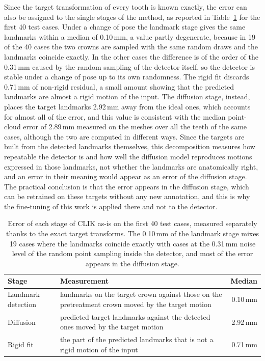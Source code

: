 \documentclass[10pt,a4paper]{article}
\begin{document}
Since the target transformation of every tooth is known exactly, the error can also be assigned to the single stages of the method, as reported in Table~\ref{tab:decomposition} for the first 40 test cases. Under a change of pose the landmark stage gives the same landmarks within a median of 0.10\,mm, a value partly degenerate, because in 19 of the 40 cases the two crowns are sampled with the same random draws and the landmarks coincide exactly. In the other cases the difference is of the order of the 0.31\,mm caused by the random sampling of the detector itself, so the detector is stable under a change of pose up to its own randomness. The rigid fit discards 0.71\,mm of non-rigid residual, a small amount showing that the predicted landmarks are almost a rigid motion of the input. The diffusion stage, instead, places the target landmarks 2.92\,mm away from the ideal ones, which accounts for almost all of the error, and this value is consistent with the median point-cloud error of 2.89\,mm measured on the meshes over all the teeth of the same cases, although the two are computed in different ways. Since the targets are built from the detected landmarks themselves, this decomposition measures how repeatable the detector is and how well the diffusion model reproduces motions expressed in those landmarks, not whether the landmarks are anatomically right, and an error in their meaning would appear as an error of the diffusion stage. The practical conclusion is that the error appears in the diffusion stage, which can be retrained on these targets without any new annotation, and this is why the fine-tuning of this work is applied there and not to the detector.

\begin{table}[H]
\centering
\small
\begin{tabularx}{\textwidth}{@{}lXr@{}}
\toprule
Stage & Measurement & Median \\
\midrule
Landmark detection & landmarks on the target crown against those on the pretreatment crown moved by the target motion & 0.10\,mm \\
Diffusion & predicted target landmarks against the detected ones moved by the target motion & 2.92\,mm \\
Rigid fit & the part of the predicted landmarks that is not a rigid motion of the input & 0.71\,mm \\
\bottomrule
\end{tabularx}
\caption{Error of each stage of CLIK as-is on the first 40 test cases, measured separately thanks to the exact target transforms. The 0.10\,mm of the landmark stage mixes 19 cases where the landmarks coincide exactly with cases at the 0.31\,mm noise level of the random point sampling inside the detector, and most of the error appears in the diffusion stage.}
\label{tab:decomposition}
\end{table}
\end{document}
